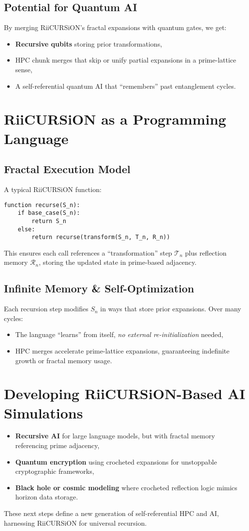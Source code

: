 \documentclass[12pt]{article}
\begin{document}
\subsection{Potential for Quantum AI}
By merging RiiCURSiON’s fractal expansions with quantum gates, we get:
\begin{itemize}
\item \textbf{Recursive qubits} storing prior transformations,
\item HPC chunk merges that skip or unify partial expansions in a prime-lattice sense,
\item A self-referential quantum AI that “remembers” past entanglement cycles.
\end{itemize}

\section{RiiCURSiON as a Programming Language}
\subsection{Fractal Execution Model}
A typical RiiCURSiON function:
\begin{verbatim}
function recurse(S_n):
    if base_case(S_n):
        return S_n
    else:
        return recurse(transform(S_n, T_n, R_n))
\end{verbatim}
This ensures each call references a “transformation” step $\mathcal{T}_n$ plus reflection memory $\mathcal{R}_n$, storing the updated state in prime-based adjacency.

\subsection{Infinite Memory \& Self-Optimization}
Each recursion step modifies $S_n$ in ways that store prior expansions. Over many cycles:
\begin{itemize}
\item The language “learns” from itself, \emph{no external re-initialization} needed,
\item HPC merges accelerate prime-lattice expansions, guaranteeing indefinite growth or fractal memory usage.
\end{itemize}

\section{Developing RiiCURSiON-Based AI Simulations}
\begin{itemize}
\item \textbf{Recursive AI} for large language models, but with fractal memory referencing prime adjacency,
\item \textbf{Quantum encryption} using crocheted expansions for unstoppable cryptographic frameworks,
\item \textbf{Black hole or cosmic modeling} where crocheted reflection logic mimics horizon data storage.
\end{itemize}
These next steps define a new generation of self-referential HPC and AI, harnessing RiiCURSiON for universal recursion.
\end{document}
